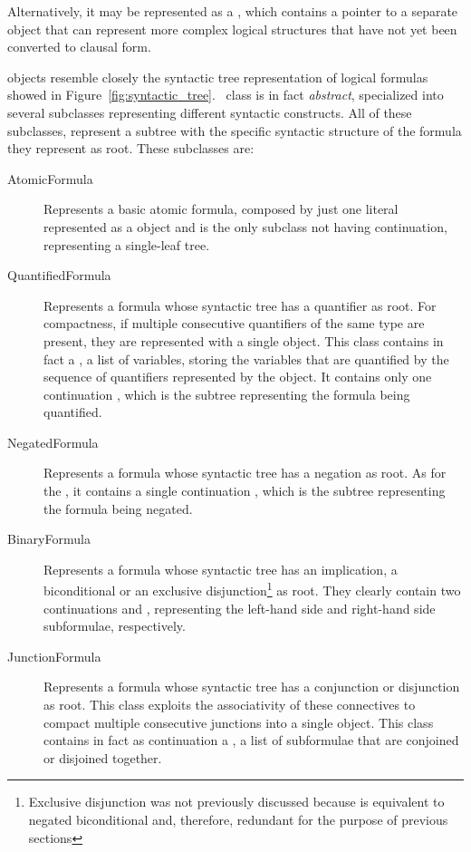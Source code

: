 Alternatively, it may be represented as a , which contains a pointer to a separate  object that can represent more complex logical structures that have not yet been converted to clausal form.

 objects resemble closely the syntactic tree representation of logical formulas showed in Figure~\ref{fig:syntactic_tree}.\  class is in fact \emph{abstract}, specialized into several subclasses representing different syntactic constructs.
All of these subclasses, represent a subtree with the specific syntactic structure of the formula they represent as root.
These subclasses are:

\begin{description}
  \item[AtomicFormula]  Represents a basic atomic formula, composed by just one literal represented as a  object and is the only subclass not having continuation, representing a single-leaf tree.
  \item[QuantifiedFormula]  Represents a formula whose syntactic tree has a quantifier as root.
                            For compactness, if multiple consecutive quantifiers of the same type are present, they are represented with a single  object.
                            This class contains in fact a , a list of variables, storing the variables that are quantified by the sequence of quantifiers represented by the object.
                            It contains only one continuation , which is the subtree representing the formula being quantified.
  \item[NegatedFormula] Represents a formula whose syntactic tree has a negation as root.
                        As for the , it contains a single continuation , which is the subtree representing the formula being negated.
  \item[BinaryFormula]  Represents a formula whose syntactic tree has an implication, a biconditional or an exclusive disjunction\footnote{
                        Exclusive disjunction was not previously discussed because is equivalent to negated biconditional and, therefore, redundant for the purpose of previous sections} as root.
                        They clearly contain two continuations  and , representing the left-hand side and right-hand side subformulae, respectively.
  \item[JunctionFormula]  Represents a formula whose syntactic tree has a conjunction or disjunction as root.
                          This class exploits the associativity of these connectives to compact multiple consecutive junctions into a single object.
                          This class contains in fact as continuation a , a list of subformulae that are conjoined or disjoined together.
\end{description}

